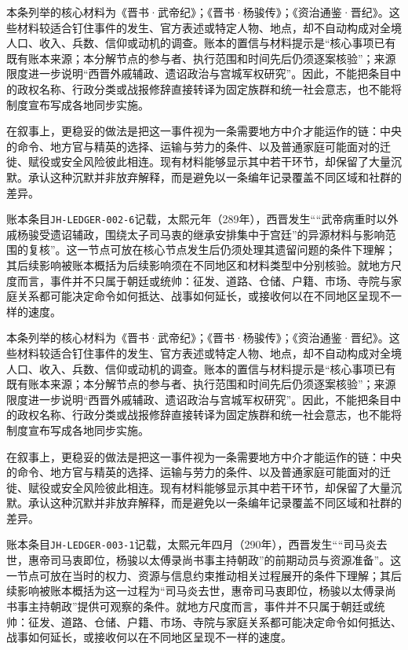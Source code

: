本条列举的核心材料为《晋书·武帝纪》；《晋书·杨骏传》；《资治通鉴·晋纪》。这些材料较适合钉住事件的发生、官方表述或特定人物、地点，却不自动构成对全境人口、收入、兵数、信仰或动机的调查。账本的置信与材料提示是“核心事项已有既有账本来源；本分解节点的参与者、执行范围和时间先后仍须逐案核验”；来源限度进一步说明“西晋外戚辅政、遗诏政治与宫城军权研究”。因此，不能把条目中的政权名称、行政分类或战报修辞直接转译为固定族群和统一社会意志，也不能将制度宣布写成各地同步实施。

在叙事上，更稳妥的做法是把这一事件视为一条需要地方中介才能运作的链：中央的命令、地方官与精英的选择、运输与劳力的条件、以及普通家庭可能面对的迁徙、赋役或安全风险彼此相连。现有材料能够显示其中若干环节，却保留了大量沉默。承认这种沉默并非放弃解释，而是避免以一条编年记录覆盖不同区域和社群的差异。

账本条目\texttt{JH-LEDGER-002-6}记载，太熙元年（289年），西晋发生““武帝病重时以外戚杨骏受遗诏辅政，围绕太子司马衷的继承安排集中于宫廷”的异源材料与影响范围的复核”。这一节点可放在核心节点发生后仍须处理其遗留问题的条件下理解；其后续影响被账本概括为后续影响须在不同地区和材料类型中分别核验。就地方尺度而言，事件并不只属于朝廷或统帅：征发、道路、仓储、户籍、市场、寺院与家庭关系都可能决定命令如何抵达、战事如何延长，或接收何以在不同地区呈现不一样的速度。

本条列举的核心材料为《晋书·武帝纪》；《晋书·杨骏传》；《资治通鉴·晋纪》。这些材料较适合钉住事件的发生、官方表述或特定人物、地点，却不自动构成对全境人口、收入、兵数、信仰或动机的调查。账本的置信与材料提示是“核心事项已有既有账本来源；本分解节点的参与者、执行范围和时间先后仍须逐案核验”；来源限度进一步说明“西晋外戚辅政、遗诏政治与宫城军权研究”。因此，不能把条目中的政权名称、行政分类或战报修辞直接转译为固定族群和统一社会意志，也不能将制度宣布写成各地同步实施。

在叙事上，更稳妥的做法是把这一事件视为一条需要地方中介才能运作的链：中央的命令、地方官与精英的选择、运输与劳力的条件、以及普通家庭可能面对的迁徙、赋役或安全风险彼此相连。现有材料能够显示其中若干环节，却保留了大量沉默。承认这种沉默并非放弃解释，而是避免以一条编年记录覆盖不同区域和社群的差异。

账本条目\texttt{JH-LEDGER-003-1}记载，太熙元年四月（290年），西晋发生““司马炎去世，惠帝司马衷即位，杨骏以太傅录尚书事主持朝政”的前期动员与资源准备”。这一节点可放在当时的权力、资源与信息约束推动相关过程展开的条件下理解；其后续影响被账本概括为这一过程为“司马炎去世，惠帝司马衷即位，杨骏以太傅录尚书事主持朝政”提供可观察的条件。就地方尺度而言，事件并不只属于朝廷或统帅：征发、道路、仓储、户籍、市场、寺院与家庭关系都可能决定命令如何抵达、战事如何延长，或接收何以在不同地区呈现不一样的速度。

